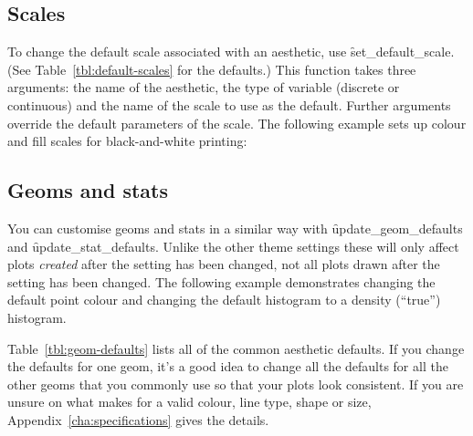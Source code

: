 \subsection{Scales}
\label{sub:customise-scales}

To change the default scale associated with an aesthetic, use \f{set_default_scale}. (See Table~\ref{tbl:default-scales} for the defaults.)  This function takes three arguments: the name of the aesthetic, the type of variable (discrete or continuous) and the name of the scale to use as the default.  Further arguments override the default parameters of the scale.  The following example sets up colour and fill scales for black-and-white printing:  

% 


\subsection{Geoms and stats}
\label{sub:geoms_and_stats}

You can customise geoms and stats in a similar way with \f{update_geom_defaults} and \f{update_stat_defaults}.  Unlike the other theme settings these will only affect plots \emph{created} after the setting has been changed, not all plots drawn after the setting has been changed.  The following example demonstrates changing the default point colour and changing the default histogram to a density (``true'') histogram.    

% 


Table~\ref{tbl:geom-defaults} lists all of the common aesthetic defaults.  If you change the defaults for one geom, it's a good idea to change all the defaults for all the other geoms that you commonly use so that your plots look consistent.  If you are unsure on what makes for a valid colour, line type, shape or size, Appendix~\ref{cha:specifications} gives the details. 

